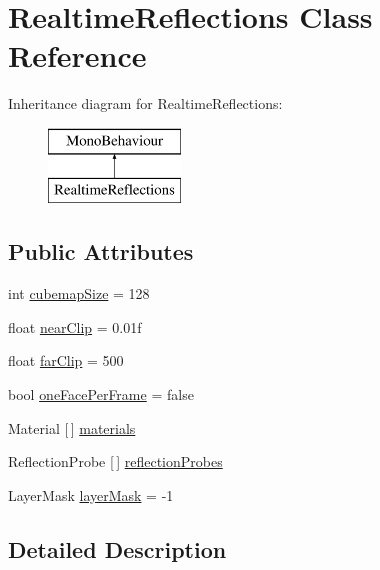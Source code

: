 \hypertarget{class_realtime_reflections}{}\section{Realtime\+Reflections Class Reference}
\label{class_realtime_reflections}
Inheritance diagram for Realtime\+Reflections\+:\begin{figure}[H]
\begin{center}
\leavevmode
\includegraphics[height=2.000000cm]{class_realtime_reflections}
\end{center}
\end{figure}
\subsection*{Public Attributes}
\begin{DoxyCompactItemize}
\item 
int \mbox{\hyperlink{class_realtime_reflections_a4630c8d321236e50251778c8e527e684}{cubemap\+Size}} = 128
\item 
float \mbox{\hyperlink{class_realtime_reflections_a786d1c3a041423744baa528631b904d1}{near\+Clip}} = 0.\+01f
\item 
float \mbox{\hyperlink{class_realtime_reflections_a8a0451b3ec0d3e12ef0f4661b10f3263}{far\+Clip}} = 500
\item 
bool \mbox{\hyperlink{class_realtime_reflections_a1eb5f6bd6388c438c03f30022bf0d131}{one\+Face\+Per\+Frame}} = false
\item 
Material \mbox{[}$\,$\mbox{]} \mbox{\hyperlink{class_realtime_reflections_a81ef950d9f53af9850504aa659cd2ed9}{materials}}
\item 
Reflection\+Probe \mbox{[}$\,$\mbox{]} \mbox{\hyperlink{class_realtime_reflections_aff4ee68849eba4669a912c3bbde3d6da}{reflection\+Probes}}
\item 
Layer\+Mask \mbox{\hyperlink{class_realtime_reflections_a2a44b6a6be9de741c64e83b04ff98604}{layer\+Mask}} = -\/1
\end{DoxyCompactItemize}


\subsection{Detailed Description}



